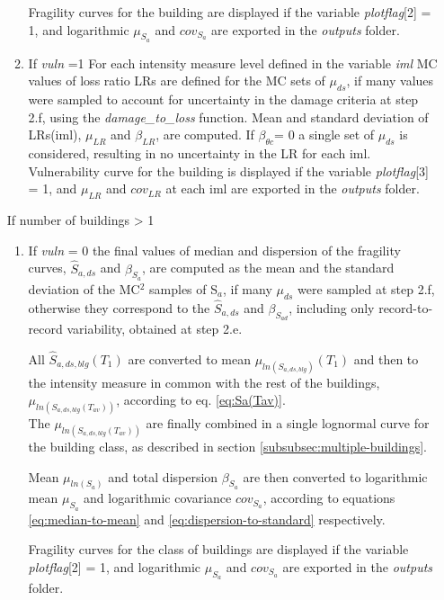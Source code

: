 \begin{enumerate}
\begin{enumerate}
Fragility curves for the building are displayed if the variable \textit{plotflag}[2] = 1, and logarithmic $\mu_{S_a}$ and $cov_{S_a}$ are exported in the \textit{outputs} folder.

\item 
If \textit{vuln} =1
For each intensity measure level defined in the variable \textit{iml} MC values of loss ratio LRs are defined for the MC sets of $\mu_{ds}$, if many values were sampled to account for uncertainty in the damage criteria at step 2.f, using the \textit{damage\_to\_loss} function. Mean and standard deviation of LRs(iml), $\mu_{LR}$ and $\beta_{LR}$, are computed. If $\beta_{\theta c}$= 0 a single set of $\mu_{ds}$ is considered, resulting in no uncertainty in the LR for each iml.\\

Vulnerability curve for the building is displayed if the variable \textit{plotflag}[3] = 1, and $\mu_{LR}$ and $cov_{LR}$ at each iml are exported in the \textit{outputs} folder.\\

\end{enumerate}

If number of buildings > 1\\
\begin{enumerate}
\item If \textit{vuln} = 0
the final values of median and dispersion of the fragility curves, $\hat{S}_{a,ds}$ and $\beta_{S_a}$, are computed as the mean and the standard deviation of the MC$^2$ samples of S$_a$, if many $\mu_{ds}$ were sampled at step 2.f, otherwise they correspond to the $\hat{S}_{a,ds}$ and $\beta_{S_{a d}}$, including only record-to-record variability, obtained at step 2.e.

All $\hat{S}_{a, ds, blg}(T_1)$ are converted to mean $\mu_{ln(S_{a, ds, blg})}(T_1)$ and then to the intensity measure in common with the rest of the buildings, $\mu_{ln(S_{a, ds, blg}(T_{av}))}$, according to eq. \ref{eq:Sa(Tav)}.\\
The $\mu_{ln(S_{a, ds, blg}(T_{av}))}$ are finally combined in a single lognormal curve for the building class, as described in section \ref{subsubsec:multiple-buildings}. 

Mean $\mu_{ln(S_{a})}$ and total dispersion $\beta_{S_a}$ are then converted to logarithmic mean $\mu_{S_a}$ and logarithmic covariance $cov_{S_a}$, according to equations \ref{eq:median-to-mean} and \ref{eq:dispersion-to-standard} respectively.

Fragility curves for the class of buildings are displayed if the variable \textit{plotflag}[2] = 1, and logarithmic $\mu_{S_a}$ and $cov_{S_a}$ are exported in the \textit{outputs} folder.


\end{enumerate}
\end{enumerate}
